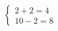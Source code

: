\documentclass[preview]{standalone}
\begin{document}
\begin{align*}
\left\{ \begin{array}{cl} 2 + 2 = 4 \\ 10 - 2 = 8 \end{array} \right.
\end{align*}
\end{document}
